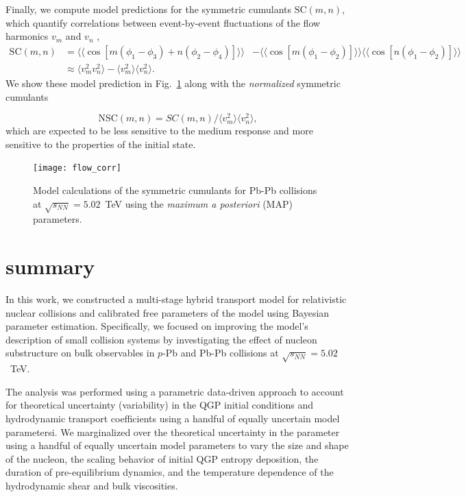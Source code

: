 \documentclass[aps,prc,reprint,amsmath,nofootinbib]{revtex4-1}
\newcommand{\sqrts}{\sqrt{s_{NN}}}
\def\\#1{ #1}
\begin{document}
Finally, we compute model predictions for the symmetric cumulants $\mathrm{SC}(m,n)$, which quantify correlations between event-by-event fluctuations of the flow harmonics $v_m$ and $v_n$ \cite{Bilandzic:2013kga, ALICE:2016kpq},
\begin{align}
  \mathrm{SC}(m, n) &= \langle\langle \cos[m(\phi_1 - \phi_3) + n(\phi_2-\phi_4)]\rangle\rangle \nonumber \\
\nonumber &- \langle\langle\cos[m(\phi_1-\phi_2)]\rangle\rangle\langle\langle\cos[n(\phi_1-\phi_2)]\rangle\rangle \label{eq:scmn}\\
&\approx \langle v_m^2 v_n^2 \rangle - \langle v_m^2\rangle\langle v_n^2\rangle.
\end{align}
We show these model prediction in Fig.~\ref{fig:flow_corr} along with the \emph{normalized} symmetric cumulants

\begin{equation}
  \mathrm{NSC}(m,n) = SC(m,n)/\langle v_m^2\rangle\langle v_n^2\rangle,
\end{equation}
which are expected to be less sensitive to the medium response and more sensitive to the properties of the initial state.

\begin{figure}
  \texttt{[image: flow\_corr]}
  \caption{Model calculations of the symmetric cumulants for Pb-Pb collisions at $\sqrts=5.02$~TeV using the \emph{maximum a posteriori} (MAP) parameters.}
  \label{fig:flow_corr}
\end{figure}

\section{summary}
\label{sec:summary}

In this work, we constructed a multi-stage hybrid transport model for relativistic nuclear collisions and calibrated free parameters of the model using Bayesian parameter estimation.
Specifically, we focused on improving the model's description of small collision systems by investigating the effect of nucleon substructure on bulk observables in $p$-Pb and Pb-Pb collisions at $\sqrts=5.02$~TeV.

The analysis was performed using a parametric data-driven approach to account for theoretical uncertainty (variability) in the QGP initial conditions and hydrodynamic transport coefficients using a handful of equally uncertain model parametersi.
We marginalized over the theoretical uncertainty in the parameter using a handful of equally uncertain model parameters to vary the size and shape of the nucleon, the scaling behavior of initial QGP entropy deposition, the duration of pre-equilibrium dynamics, and the temperature dependence of the hydrodynamic shear and bulk viscosities.
\end{document}
